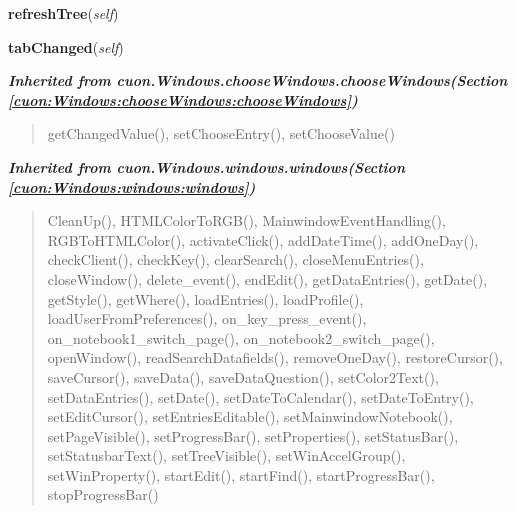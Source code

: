     \vspace{0.5ex}

\hspace{.8\funcindent}\begin{boxedminipage}{\funcwidth}

    \raggedright \textbf{refreshTree}(\textit{self})

\setlength{\parskip}{2ex}
\setlength{\parskip}{1ex}
    \end{boxedminipage}

    \label{cuon:Order:order:orderwindow:tabChanged}

    \vspace{0.5ex}

\hspace{.8\funcindent}\begin{boxedminipage}{\funcwidth}

    \raggedright \textbf{tabChanged}(\textit{self})

\setlength{\parskip}{2ex}
\setlength{\parskip}{1ex}
    \end{boxedminipage}


\large{\textbf{\textit{Inherited from cuon.Windows.chooseWindows.chooseWindows\textit{(Section \ref{cuon:Windows:chooseWindows:chooseWindows})}}}}

\begin{quote}
getChangedValue(), setChooseEntry(), setChooseValue()
\end{quote}

\large{\textbf{\textit{Inherited from cuon.Windows.windows.windows\textit{(Section \ref{cuon:Windows:windows:windows})}}}}

\begin{quote}
CleanUp(), HTMLColorToRGB(), MainwindowEventHandling(), RGBToHTMLColor(), activateClick(), addDateTime(), addOneDay(), checkClient(), checkKey(), clearSearch(), closeMenuEntries(), closeWindow(), delete\_event(), endEdit(), getDataEntries(), getDate(), getStyle(), getWhere(), loadEntries(), loadProfile(), loadUserFromPreferences(), on\_key\_press\_event(), on\_notebook1\_switch\_page(), on\_notebook2\_switch\_page(), openWindow(), readSearchDatafields(), removeOneDay(), restoreCursor(), saveCursor(), saveData(), saveDataQuestion(), setColor2Text(), setDataEntries(), setDate(), setDateToCalendar(), setDateToEntry(), setEditCursor(), setEntriesEditable(), setMainwindowNotebook(), setPageVisible(), setProgressBar(), setProperties(), setStatusBar(), setStatusbarText(), setTreeVisible(), setWinAccelGroup(), setWinProperty(), startEdit(), startFind(), startProgressBar(), stopProgressBar()
\end{quote}

